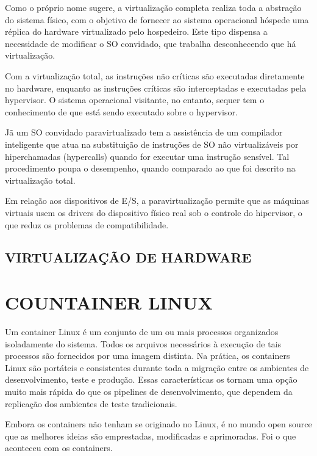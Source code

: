 Como o próprio nome sugere, a virtualização completa realiza toda a abstração do sistema físico, com o objetivo de fornecer ao sistema operacional hóspede uma réplica do hardware  virtualizado pelo hospedeiro. Este tipo dispensa a necessidade de modificar o SO convidado, que trabalha desconhecendo que há virtualização.

Com a virtualização total, as instruções não críticas são executadas diretamente no hardware, enquanto as instruções críticas são interceptadas e executadas pela hypervisor. O sistema operacional visitante, no entanto, sequer tem o conhecimento de que está sendo executado sobre o hypervisor.

Jã um SO convidado paravirtualizado tem a assistência de um compilador inteligente que atua na substituição de instruções de SO não virtualizáveis por hiperchamadas (hypercalls) quando for executar uma instrução sensível. Tal procedimento poupa o desempenho, quando comparado ao que foi descrito na virtualização total.

Em relação aos dispositivos de E/S, a paravirtualização permite que as máquinas virtuais usem os drivers do dispositivo físico real sob o controle do hipervisor, o que reduz os problemas de compatibilidade.

\subsection{VIRTUALIZAÇÃO DE HARDWARE}
\label{sec:virtualizacao-hardware}

\section{COUNTAINER LINUX}
\label{sec:linux-countainer}

Um container Linux é um conjunto de um ou mais processos organizados isoladamente do sistema. Todos os arquivos necessários à execução de tais processos são fornecidos por uma imagem distinta. Na prática, os containers Linux são portáteis e consistentes durante toda a migração entre os ambientes de desenvolvimento, teste e produção. Essas características os tornam uma opção muito mais rápida do que os pipelines de desenvolvimento, que dependem da replicação dos ambientes de teste tradicionais.

Embora os containers não tenham se originado no Linux, é no mundo open source que as melhores ideias são emprestadas, modificadas e aprimoradas. Foi o que aconteceu com os containers.


